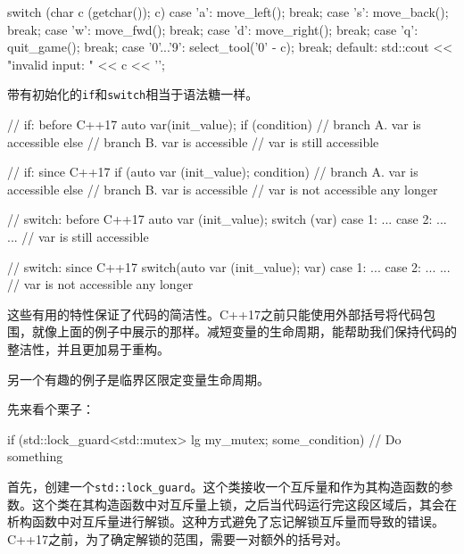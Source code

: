 \begin{codebox}[cpp]
switch (char c (getchar()); c) {
  case 'a': move_left(); break;
  case 's': move_back(); break;
  case 'w': move_fwd(); break;
  case 'd': move_right(); break;
  case 'q': quit_game(); break;
  case '0'...'9': select_tool('0' - c); break;
  default:
    std::cout << "invalid input: " << c << '\n';
}
\end{codebox}


带有初始化的\texttt{if}和\texttt{switch}相当于语法糖一样。

\begin{codebox}[cpp]
// if: before C++17
{
    auto var(init_value);
    if (condition){
        // branch A. var is accessible
    } else {
        // branch B. var is accessible
    }
    // var is still accessible
}
\end{codebox}

\begin{codebox}[cpp]
// if: since C++17
if (auto var (init_value); condition){
    // branch A. var is accessible
} else {
    // branch B. var is accessible
}
// var is not accessible any longer
\end{codebox}

\begin{codebox}[cpp]
// switch: before C++17
{
    auto var (init_value);
    switch (var) {
      case 1: ...
      case 2: ...
      ...
    }
    // var is still accessible
}
\end{codebox}

\begin{codebox}[cpp]
// switch: since C++17
switch(auto var (init_value); var){
    case 1: ...
    case 2: ...
    ...
}
// var is not accessible any longer
\end{codebox}

这些有用的特性保证了代码的简洁性。C++17之前只能使用外部括号将代码包围，就像上面的例子中展示的那样。减短变量的生命周期，能帮助我们保持代码的整洁性，并且更加易于重构。


另一个有趣的例子是临界区限定变量生命周期。

先来看个栗子：

\begin{codebox}[cpp]
if (std::lock_guard<std::mutex> lg {my_mutex}; some_condition) {
  // Do something
}
\end{codebox}

首先，创建一个\texttt{std::lock\_guard}。这个类接收一个互斥量和作为其构造函数的参数。这个类在其构造函数中对互斥量上锁，之后当代码运行完这段区域后，其会在析构函数中对互斥量进行解锁。这种方式避免了忘记解锁互斥量而导致的错误。C++17之前，为了确定解锁的范围，需要一对额外的括号对。

